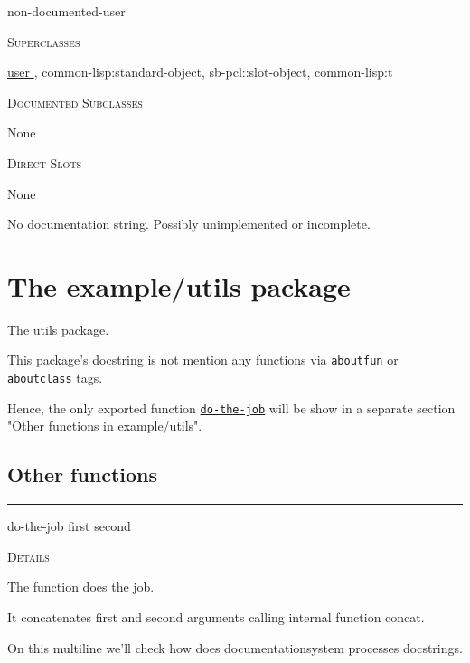 \documentclass[a4paper]{report}
\begin{document}
    \label{example/class__class__non-documented-user}
    \begin{defun}[Class]
    non-documented-user


      
    \bigskip
    \textsc{Superclasses}

\hyperref[example/class__class__user]{
	  user
	}
      , \color[rgb]{0.5,0.5,0.5}common-lisp:standard-object\color[rgb]{0,0,0}, \color[rgb]{0.5,0.5,0.5}sb-pcl::slot-object\color[rgb]{0,0,0}, \color[rgb]{0.5,0.5,0.5}common-lisp:t\color[rgb]{0,0,0}


      
    \bigskip
    \textsc{Documented Subclasses}


	    None
	  


	
    \bigskip
    \textsc{Direct Slots}


	      None
	    


	No documentation string.  Possibly unimplemented or incomplete.
	


    
    \end{defun}
  
  
    \chapter{The example/utils package}
    The utils package.

This package's docstring is not mention any functions via \texttt{aboutfun} or \texttt{aboutclass} tags.

Hence, the only exported function \hyperref[example/utils__fun__do-the-job]{\texttt{do-the-job}}
   will be show in a separate
section "Other functions in example/utils".
      \section{Other functions}
      

    \rule{\linewidth}{0.1mm}
    
    \label{example/utils__fun__do-the-job}
    \begin{defun}[Function]
    do-the-job first second


	
    \bigskip
    \textsc{Details}

The function does the job.

It concatenates first and second arguments
calling internal function concat.


On this multiline we'll check how does documentationsystem processes docstrings.


    
    \end{defun}
  
  

    \printindex
    
\end{document}
